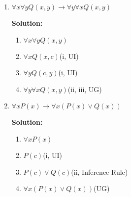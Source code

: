 \documentclass[12pt]{article}
\begin{document}
\begin{enumerate}
\begin{enumerate}
\newpage

\item
$\forall x \forall y Q(x,y) \to \forall y \forall x Q(x,y)$

{\bf Solution:}

\begin{enumerate}
	\item $\forall x \forall y Q(x,y)$
	\item $\forall x Q(x, c)$\hfill(i, UI)
	\item $\forall y Q(c,y)$\hfill(i, UI)
	\item $\forall y \forall x Q(x,y)$\hfill(ii, iii, UG)
\end{enumerate}
\newpage

\item
$\forall x P(x) \to \forall x(P(x) \lor Q(x))$

{\bf Solution:}

\begin{enumerate}
	\item $\forall xP(x)$
	\item $P(c)$\hfill(i, UI)
	\item $P(c) \lor Q(c)$\hfill(ii, Inference Rule)
	\item $\forall x(P(x) \lor Q(x))$\hfill(UG)
\end{enumerate}
\newpage

\end{enumerate}

\end{enumerate}
\end{document}
